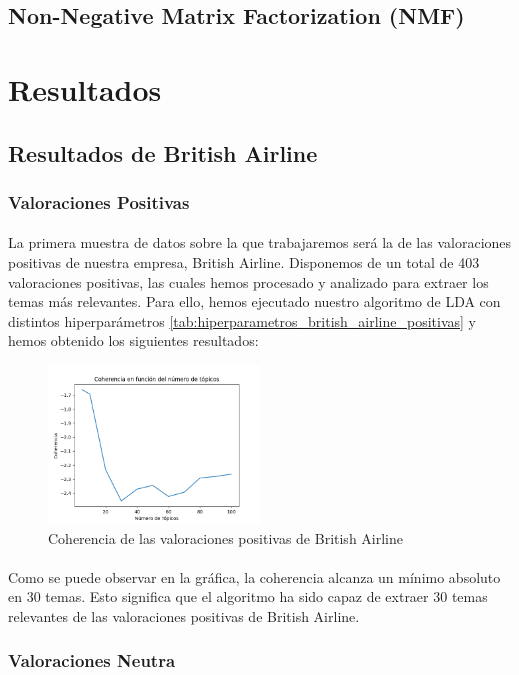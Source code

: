 \documentclass{report}
\begin{document}
            \subsection{Non-Negative Matrix Factorization (NMF)}
        \clearpage\section{Resultados}
            \subsection{Resultados de British Airline}
                \subsubsection*{Valoraciones Positivas}
                    \paragraph*{}{
                        La primera muestra de datos sobre la que trabajaremos será la de las valoraciones positivas de nuestra empresa, British Airline.
                        Disponemos de un total de 403 valoraciones positivas, las cuales hemos procesado y analizado para extraer los temas más relevantes.
                        Para ello, hemos ejecutado nuestro algoritmo de LDA con distintos hiperparámetros \ref{tab:hiperparametros_british_airline_positivas} y hemos obtenido los siguientes resultados: 
                    }
                    \begin{figure}[H]
                        \centering
                        \includegraphics[width=0.5\textwidth]{./img/british_airline_positivas.png}
                        \caption{Coherencia de las valoraciones positivas de British Airline}
                    \end{figure}
                    \paragraph*{}{
                        Como se puede observar en la gráfica, la coherencia alcanza un mínimo absoluto en 30 temas.
                        Esto significa que el algoritmo ha sido capaz de extraer 30 temas relevantes de las valoraciones positivas de British Airline. 
                    }
                \clearpage\subsubsection*{Valoraciones Neutra}
\end{document}
